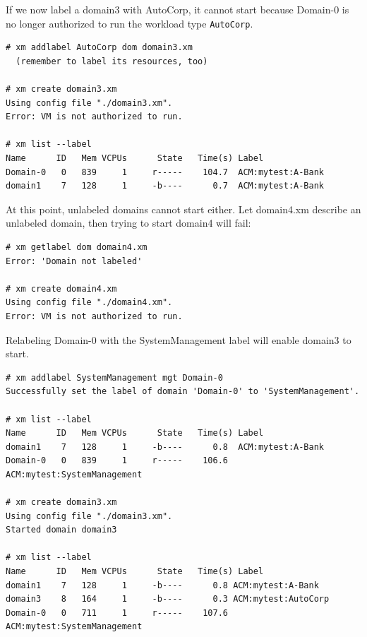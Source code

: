 \documentclass[11pt,twoside,final,openright]{report}
\begin{document}
If we now label a domain3 with AutoCorp, it cannot start because Domain-0 is
no longer authorized to run the workload type \verb|AutoCorp|.
\begin{scriptsize}
\begin{verbatim}
# xm addlabel AutoCorp dom domain3.xm
  (remember to label its resources, too)

# xm create domain3.xm
Using config file "./domain3.xm".
Error: VM is not authorized to run.

# xm list --label
Name      ID   Mem VCPUs      State   Time(s) Label
Domain-0   0   839     1     r-----    104.7  ACM:mytest:A-Bank
domain1    7   128     1     -b----      0.7  ACM:mytest:A-Bank
\end{verbatim}
\end{scriptsize}

At this point, unlabeled domains cannot start either. Let domain4.xm
describe an unlabeled domain, then trying to start domain4
will fail:
\begin{scriptsize}
\begin{verbatim}
# xm getlabel dom domain4.xm
Error: 'Domain not labeled'

# xm create domain4.xm
Using config file "./domain4.xm".
Error: VM is not authorized to run.
\end{verbatim}
\end{scriptsize}

Relabeling Domain-0 with the SystemManagement label will enable domain3 to start.
\begin{scriptsize}
\begin{verbatim}
# xm addlabel SystemManagement mgt Domain-0
Successfully set the label of domain 'Domain-0' to 'SystemManagement'.

# xm list --label
Name      ID   Mem VCPUs      State   Time(s) Label
domain1    7   128     1     -b----      0.8  ACM:mytest:A-Bank
Domain-0   0   839     1     r-----    106.6  ACM:mytest:SystemManagement

# xm create domain3.xm
Using config file "./domain3.xm".
Started domain domain3

# xm list --label
Name      ID   Mem VCPUs      State   Time(s) Label
domain1    7   128     1     -b----      0.8 ACM:mytest:A-Bank
domain3    8   164     1     -b----      0.3 ACM:mytest:AutoCorp
Domain-0   0   711     1     r-----    107.6 ACM:mytest:SystemManagement
\end{verbatim}
\end{scriptsize}
\end{document}
